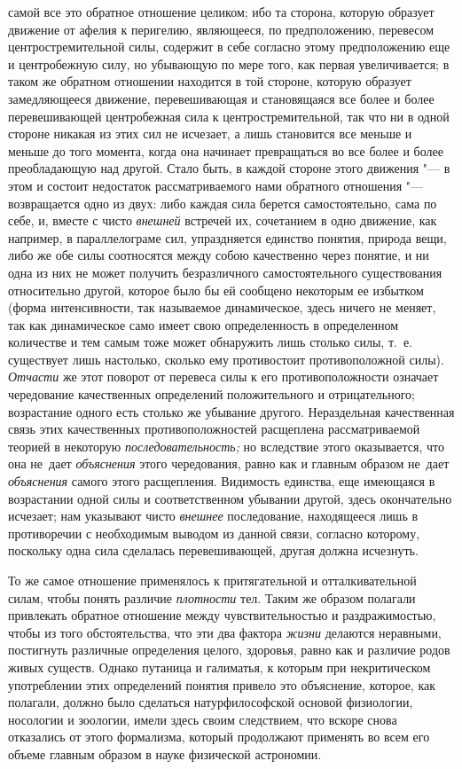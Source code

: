 самой все это обратное отношение целиком; ибо та сторона, которую образует
движение от афелия к перигелию, являющееся, по предположению, перевесом
центростремительной силы, содержит в себе согласно этому предположению еще и
центробежную силу, но убывающую по мере того, как первая увеличивается; в таком
же обратном отношении находится в той стороне, которую образует замедляющееся
движение, перевешивающая и становящаяся все более и более перевешивающей
центробежная сила к центростремительной, так что ни в одной стороне никакая из
этих сил не исчезает, а лишь становится все меньше и меньше до того момента,
когда она начинает превращаться во все более и более преобладающую над другой.
Стало быть, в каждой стороне этого движения "--- в этом и состоит недостаток
рассматриваемого нами обратного отношения "--- возвращается одно из двух: либо
каждая сила берется самостоятельно, сама по себе, и, вместе с чисто {\em
внешней} встречей их, сочетанием в одно движение, как например, в
параллелограме сил, упраздняется единство понятия, природа вещи, либо же обе
силы соотносятся между собою качественно через понятие, и ни одна из них не
может получить безразличного самостоятельного существования относительно
другой, которое было бы ей сообщено некоторым ее избытком (форма интенсивности,
так называемое динамическое, здесь ничего не меняет, так как динамическое само
имеет свою определенность в определенном количестве и тем самым тоже может
обнаружить лишь столько силы, т.~е. существует лишь настолько, сколько ему
противостоит противоположной силы). {\em Отчасти} же этот поворот от перевеса
силы к его противоположности означает чередование качественных определений
положительного и отрицательного; возрастание одного есть столько же убывание
другого. Нераздельная качественная связь этих качественных противоположностей
расщеплена рассматриваемой теорией в некоторую {\em последовательность;} но
вследствие этого оказывается, что она не~дает {\em объяснения} этого
чередования, равно как и главным образом не~дает {\em объяснения} самого этого
расщепления. Видимость единства, еще имеющаяся в возрастании одной силы и
соответственном убывании другой, здесь окончательно исчезает; нам указывают
чисто {\em внешнее} последование, находящееся лишь в противоречии с необходимым
выводом из данной связи, согласно которому, поскольку одна сила сделалась
перевешивающей, другая должна исчезнуть.

То же самое отношение применялось к притягательной и отталкивательной силам,
чтобы понять различие {\em плотности} тел. Таким же образом полагали привлекать
обратное отношение между чувствительностью и раздражимостью, чтобы из того
обстоятельства, что эти два фактора {\em жизни} делаются неравными, постигнуть
различные определения целого, здоровья, равно как и различие родов живых
существ. Однако путаница и галиматья, к которым при некритическом употреблении
этих определений понятия привело это объяснение, которое, как полагали, должно
было сделаться натурфилософской основой физиологии, носологии и зоологии, имели
здесь своим следствием, что вскоре снова отказались от этого формализма,
который продолжают применять во всем его объеме главным образом в науке
физической астрономии.

